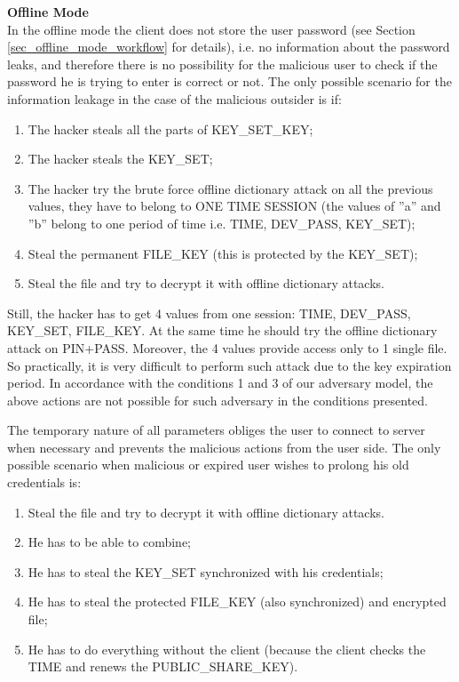\documentclass[twocolumn]{svjour3}          	%
\begin{document}
\textbf{Offline Mode}\\

In the offline mode the client does not store the user password (see Section \ref{sec_offline_mode_workflow} for details), i.e. no information about the password leaks, and therefore there is no possibility for the malicious user to check if the password he is trying to enter is correct or not. The only possible scenario for the information leakage in the case of the malicious outsider is if:

\begin{enumerate}[label=(\alph*)]
	\item The hacker steals all the parts of KEY\_SET\_KEY;
	\item The hacker steals the KEY\_SET;
	\item The hacker try the brute force offline dictionary attack on all the previous values, they have to belong to ONE TIME SESSION (the values of ”a” and ”b” belong to one period of time i.e. TIME, DEV\_PASS, KEY\_SET);
	\item Steal the permanent FILE\_KEY (this is protected by the KEY\_SET);
	\item Steal the file and try to decrypt it with offline dictionary attacks.
\end{enumerate}

Still, the hacker has to get 4 values from one session: TIME, DEV\_PASS, KEY\_SET, FILE\_KEY. At the same time he should try the offline dictionary attack on PIN+PASS. Moreover, the 4 values provide access only to 1 single file. So practically, it is very difficult to perform such attack due to the key expiration period. In accordance with the conditions 1 and 3 of our adversary model, the above actions are not possible for such adversary in the conditions presented.

The temporary nature of all parameters obliges the user to connect to server when necessary and prevents the malicious actions from the user side. The only possible scenario when malicious or expired user wishes to prolong his old credentials is:

\begin{enumerate}[label=(\alph*)]
	\item Steal the file and try to decrypt it with offline dictionary attacks.
	\item He has to be able to combine;
	\item He has to steal the KEY\_SET synchronized with his credentials;
	\item He has to steal the protected FILE\_KEY (also synchronized) and encrypted file;
	\item He has to do everything without the client (because the client checks the TIME and renews the PUBLIC\_SHARE\_KEY).
\end{enumerate}
\end{document}
